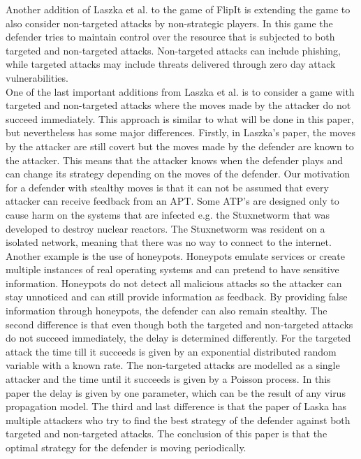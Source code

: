 Another addition of Laszka et al. to the game of FlipIt \cite{MitigationCovert} 
is extending the game to also consider non-targeted attacks by non-strategic players. In this game the defender tries to maintain control over the resource that is subjected to both targeted and non-targeted attacks. Non-targeted attacks can include phishing, while targeted attacks may include threats delivered through zero day attack vulnerabilities. \\
One of the last important additions from Laszka et al. \cite{MitigationNonTargeted} is to consider a game with targeted and non-targeted attacks where the moves made by the attacker do not succeed immediately. This approach is similar to what will be done in this paper, but nevertheless has some major differences. Firstly, in Laszka's paper, the moves by the attacker are still covert but the moves made by the defender are known to the attacker. This means that the attacker knows when the defender plays and can change its strategy depending on the moves of the defender. Our motivation for a defender with stealthy moves is that it can not be assumed that every attacker can receive feedback from an APT. Some ATP's are designed only to cause harm on the systems that are infected e.g. the Stuxnetworm that was developed to destroy nuclear reactors. The Stuxnetworm was resident on a isolated network, meaning that there was no way to connect to the internet. Another example is the use of honeypots. Honeypots emulate services or create multiple instances of real operating systems and can pretend to have sensitive information.  Honeypots do not detect all malicious attacks so the attacker can stay unnoticed and can still provide information as feedback. By providing false information through honeypots, the defender can also remain stealthy. The second difference is that even though both the targeted and non-targeted attacks do not succeed immediately, the delay is determined differently. For the targeted attack the time till it succeeds is given by an exponential distributed random variable with a known rate. The non-targeted attacks are modelled as a single attacker and the time until it succeeds is given by a Poisson process. In this paper the delay is given by one parameter, which can be the result of any virus propagation model. The third and last difference is that the paper of Laska has multiple attackers who try to find the best strategy of the defender against both targeted and non-targeted attacks. The conclusion of this paper is that the optimal strategy for the defender is moving periodically. \\ 

